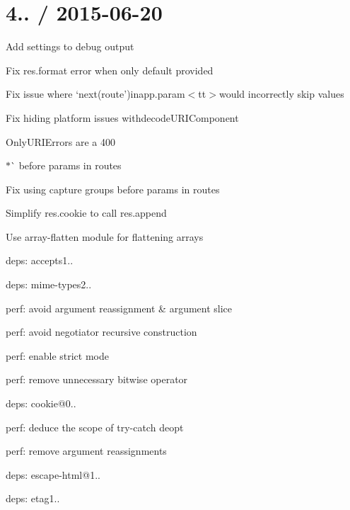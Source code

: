 \section*{4.. / 2015-\/06-\/20 }


\begin{DoxyItemize}
\item Add settings to debug output
\item Fix {\ttfamily res.\+format} error when only {\ttfamily default} provided
\item Fix issue where `next(\textquotesingle{}route'){\ttfamily in}app.\+param$<$tt$>$would incorrectly skip values
\item Fix hiding platform issues withdecode\+U\+R\+I\+Component{\ttfamily 
\begin{DoxyItemize}
\item OnlyU\+R\+I\+Error{\ttfamily s are a 400}
\end{DoxyItemize}}
\item {$\ast$\`{} before params in routes}
\item {\ttfamily Fix using capture groups before params in routes}
\item {\ttfamily Simplify {\ttfamily res.\+cookie} to call {\ttfamily res.\+append}}
\item {\ttfamily Use {\ttfamily array-\/flatten} module for flattening arrays}
\item {\ttfamily deps\+: accepts1..
\begin{DoxyItemize}
\item deps\+: mime-\/types2..
\item perf\+: avoid argument reassignment \& argument slice
\item perf\+: avoid negotiator recursive construction
\item perf\+: enable strict mode
\item perf\+: remove unnecessary bitwise operator
\end{DoxyItemize}}
\item {\ttfamily deps\+: cookie@0..
\begin{DoxyItemize}
\item perf\+: deduce the scope of try-\/catch deopt
\item perf\+: remove argument reassignments
\end{DoxyItemize}}
\item {\ttfamily deps\+: escape-\/html@1..}
\item {\ttfamily deps\+: etag1..
}
\end{DoxyItemize}

